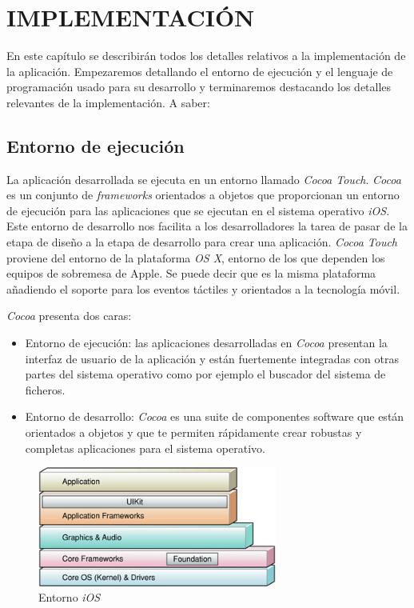 \chapter{IMPLEMENTACIÓN}
\label{ch:implemetacion}
 En este capítulo se describirán todos los detalles relativos a la implementación de la aplicación. Empezaremos detallando el entorno de ejecución y el lenguaje de programación usado para su desarrollo y terminaremos destacando los detalles relevantes de la implementación. A saber:
 
\section{Entorno de ejecución}
 La aplicación desarrollada se ejecuta en un entorno llamado \emph{Cocoa Touch}. \emph{Cocoa} es un conjunto de \emph{frameworks} orientados a objetos que proporcionan un entorno de ejecución para las aplicaciones que se ejecutan en el sistema operativo \emph{iOS}. Este entorno de desarrollo nos facilita a los desarrolladores la tarea de pasar de la etapa de diseño a la etapa de desarrollo para crear una aplicación. \emph{Cocoa Touch} proviene del entorno de la plataforma \emph{OS X}, entorno de los que dependen los equipos de sobremesa de Apple. Se puede decir que es la misma plataforma añadiendo el soporte para los eventos táctiles y orientados a la tecnología móvil. 
 
 \emph{Cocoa} presenta dos caras: 
 \begin{itemize}
	\item Entorno de ejecución: las aplicaciones desarrolladas en \emph{Cocoa} presentan la interfaz de usuario de la aplicación y están fuertemente integradas con otras partes del sistema operativo como por ejemplo el buscador del sistema de ficheros.
	\item Entorno de desarrollo: \emph{Cocoa} es una suite de componentes software que están orientados a objetos y que te permiten rápidamente crear robustas y completas aplicaciones para el sistema operativo.
\end{itemize}
  
 \begin{figure}[ht!]
    \centering
       \includegraphics[width=0.7\textwidth]{./images/architecture_stack.jpg}
     \caption{Entorno \emph{iOS}}
   \label{fig:iOS Platform}
\end{figure}
 
